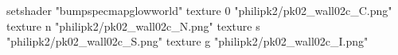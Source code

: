 setshader "bumpspecmapglowworld"
    texture 0 "philipk2/pk02_wall02c_C.png"
    texture n "philipk2/pk02_wall02c_N.png"
    texture s "philipk2/pk02_wall02c_S.png"
    texture g "philipk2/pk02_wall02c_I.png"